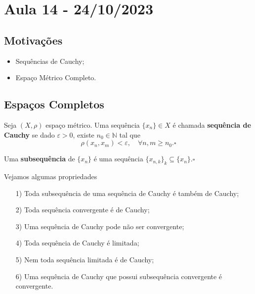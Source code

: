 \documentclass[metric_notes.tex]{subfiles}
\begin{document}
\section{Aula 14 - 24/10/2023}
\subsection{Motivações}
\begin{itemize}
	\item Sequências de Cauchy;
	\item Espaço Métrico Completo.
\end{itemize}
\subsection{Espaços Completos}
\begin{def*}
	Seja \((X, \rho )\) espaço métrico. Uma sequência \(\{x_{n}\}\in X\) é chamada \textbf{sequência de Cauchy }se dado \(\varepsilon > 0\), existe \(n_{0}\in \mathbb{N}\) tal que
	\[
		\rho (x_{n}, x_{m}) < \varepsilon ,\quad \forall n, m\geq n_{0}.\square
	\]
\end{def*}
\begin{def*}
	Uma \textbf{subsequência} de \(\{x_{n}\}\) é uma sequência \(\{x_{n, k}\}_{k}\subseteq{\{x_{n}\}}.\square\)
\end{def*}
Vejamos algumas propriedades
\begin{lemma*}
	\begin{itemize}
		\item[1)] Toda subsequência de uma sequência de Cauchy é também de Cauchy;
		\item[2)] Toda sequência convergente é de Cauchy;
		\item[3)] Uma sequência de Cauchy pode não ser convergente;
		\item[4)] Toda sequência de Cauchy é limitada;
		\item[5)] Nem toda sequência limitada é de Cauchy;
		\item[6)] Uma sequência de Cauchy que possui subsequência convergente é convergente.
	\end{itemize}
\end{lemma*}
\end{document}
